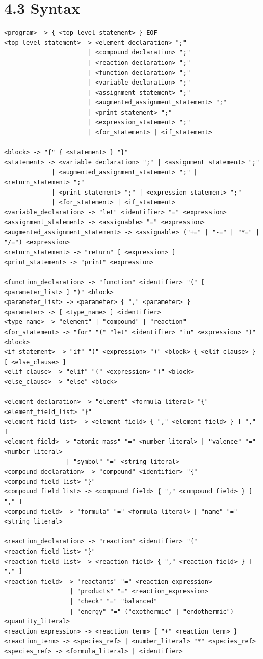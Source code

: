 \section{4.3 Syntax}
\begin{lstlisting}[style=ebnf]
<program> -> { <top_level_statement> } EOF
<top_level_statement> -> <element_declaration> ";"
                       | <compound_declaration> ";"
                       | <reaction_declaration> ";"
                       | <function_declaration> ";"
                       | <variable_declaration> ";"
                       | <assignment_statement> ";"
                       | <augmented_assignment_statement> ";"
                       | <print_statement> ";"
                       | <expression_statement> ";"
                       | <for_statement> | <if_statement>

<block> -> "{" { <statement> } "}"
<statement> -> <variable_declaration> ";" | <assignment_statement> ";"
             | <augmented_assignment_statement> ";" | <return_statement> ";"
             | <print_statement> ";" | <expression_statement> ";"
             | <for_statement> | <if_statement>
<variable_declaration> -> "let" <identifier> "=" <expression>
<assignment_statement> -> <assignable> "=" <expression>
<augmented_assignment_statement> -> <assignable> ("+=" | "-=" | "*=" | "/=") <expression>
<return_statement> -> "return" [ <expression> ]
<print_statement> -> "print" <expression>

<function_declaration> -> "function" <identifier> "(" [ <parameter_list> ] ")" <block>
<parameter_list> -> <parameter> { "," <parameter> }
<parameter> -> [ <type_name> ] <identifier>
<type_name> -> "element" | "compound" | "reaction"
<for_statement> -> "for" "(" "let" <identifier> "in" <expression> ")" <block>
<if_statement> -> "if" "(" <expression> ")" <block> { <elif_clause> } [ <else_clause> ]
<elif_clause> -> "elif" "(" <expression> ")" <block>
<else_clause> -> "else" <block>

<element_declaration> -> "element" <formula_literal> "{" <element_field_list> "}"
<element_field_list> -> <element_field> { "," <element_field> } [ "," ]
<element_field> -> "atomic_mass" "=" <number_literal> | "valence" "=" <number_literal>
                 | "symbol" "=" <string_literal>
<compound_declaration> -> "compound" <identifier> "{" <compound_field_list> "}"
<compound_field_list> -> <compound_field> { "," <compound_field> } [ "," ]
<compound_field> -> "formula" "=" <formula_literal> | "name" "=" <string_literal>

<reaction_declaration> -> "reaction" <identifier> "{" <reaction_field_list> "}"
<reaction_field_list> -> <reaction_field> { "," <reaction_field> } [ "," ]
<reaction_field> -> "reactants" "=" <reaction_expression>
                  | "products" "=" <reaction_expression>
                  | "check" "=" "balanced"
                  | "energy" "=" ("exothermic" | "endothermic") <quantity_literal>
<reaction_expression> -> <reaction_term> { "+" <reaction_term> }
<reaction_term> -> <species_ref> | <number_literal> "*" <species_ref>
<species_ref> -> <formula_literal> | <identifier>


\end{lstlisting}
